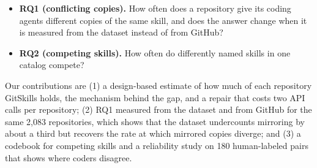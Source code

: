 \begin{itemize}
\item \textbf{RQ1 (conflicting copies).} How often does a repository give its coding agents different copies of the same skill, and does the answer change when it is measured from the dataset instead of from GitHub?
\item \textbf{RQ2 (competing skills).} How often do differently named skills in one catalog compete?
\end{itemize}

Our contributions are (1) a design-based estimate of how much of each repository GitSkills holds, the mechanism behind the gap, and a repair that costs two API calls per repository; (2) RQ1 measured from the dataset and from GitHub for the same 2,083 repositories, which shows that the dataset undercounts mirroring by about a third but recovers the rate at which mirrored copies diverge; and (3) a codebook for competing skills and a reliability study on 180 human-labeled pairs that shows where coders disagree.
